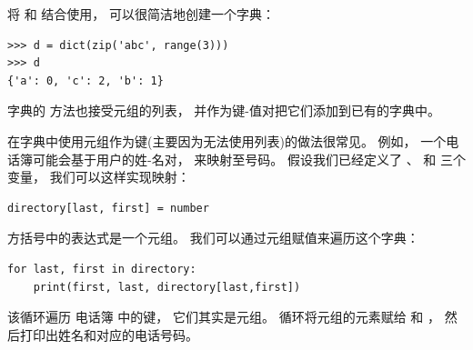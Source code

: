 {%

将  和 结合使用， 可以很简洁地创建一个字典：

\begin{lstlisting}
>>> d = dict(zip('abc', range(3)))
>>> d
{'a': 0, 'c': 2, 'b': 1}
\end{lstlisting}

%


字典的  方法也接受元组的列表， 并作为键-值对把它们添加到已有的字典中。

  
  


在字典中使用元组作为键(主要因为无法使用列表)的做法很常见。
例如， 一个电话簿可能会基于用户的姓-名对， 来映射至号码。
假设我们已经定义了  、  和  三个变量，
我们可以这样实现映射：


\begin{lstlisting}
directory[last, first] = number
\end{lstlisting}

%

方括号中的表达式是一个元组。
我们可以通过元组赋值来遍历这个字典：

\begin{lstlisting}
for last, first in directory:
    print(first, last, directory[last,first])
\end{lstlisting}

%

该循环遍历 电话簿 中的键， 它们其实是元组。
循环将元组的元素赋给  和  ， 然后打印出姓名和对应的电话号码。

}

